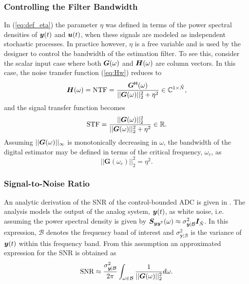 \subsubsection*{Controlling the Filter Bandwidth}
In (\ref{eq:def_eta}) the parameter $\eta$ was defined in terms of the power spectral densities of $\bm{y}(t)$ and $\bm{u}(t)$, when these signals are modeled as independent stochastic processes. In practice however, $\eta$ is a free variable and is used by the designer to control the bandwidth of the estimation filter. To see this, consider the scalar input case where both $\bm{G}(\omega)$ and $\bm{H}(\omega)$ are column vectors. In this case, the noise transfer function (\ref{eq:Hw}) reduces to
\begin{equation}
    \label{eq:atf_scalar}
    \bm{H}(\omega) = \text{NTF} = \frac{\bm{G}^\mathsf{H}(\omega)}{||\bm{G}(\omega)||_2^2 + \eta^2} \in \mathbb{C}^{1 \times \tilde{N}},
\end{equation}
and the signal transfer function becomes
\begin{equation}
    \label{eq:stf_scalar}
    \text{STF} = \frac{||\bm{G}(\omega)||_2^2}{||\bm{G}(\omega)||_2^2 + \eta^2} \in \mathbb{R}.
\end{equation}
Assuming $||\bm{G}(\omega)||_{\infty}$ is monotonically decreasing in $\omega$, the bandwidth of the digital estimator may be defined in terms of the critical frequency, $\omega_{c}$, as
\begin{equation}
    \label{eq:def_BW}
    ||\bm{G}(\omega_c)||_2^2 = \eta^2.
\end{equation}



\subsubsection*{Signal-to-Noise Ratio}
An analytic derivation of the SNR of the control-bounded ADC is given in \cite{cbc_2020_loeliger}. The analysis models the output of the analog system, $\bm{y}(t)$, as white noise, i.e. assuming the power spectral density is given by $\bm{S}_{\bm{y}\bm{y}^\mathsf{T}}(\omega) \approx \sigma_{\bm{y}|\mathcal{B}}^2\bm{I}_{\tilde{N}}$. In this expression, $\mathcal{B}$ denotes the frequency band of interest and $\sigma_{\bm{y}|\mathcal{B}}^2$ is the variance of $\bm{y}(t)$ within this frequency band. From this assumption an approximated expression for the SNR is obtained as
\begin{equation}
    \text{SNR} \approx \frac{\sigma_{\bm{y}|\mathcal{B}}^2}{2 \pi} \int_{\omega \in \mathcal{B}} \frac{1}{||\bm{G}(\omega)||_{2}^2} d\omega.
\end{equation}

